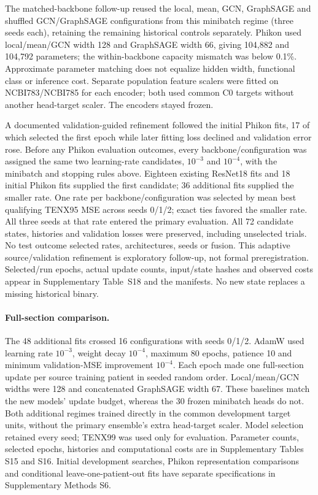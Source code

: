 The matched-backbone follow-up reused the local, mean, GCN, GraphSAGE and shuffled GCN/GraphSAGE configurations from this minibatch regime (three seeds each), retaining the remaining historical controls separately. Phikon used local/mean/GCN width 128 and GraphSAGE width 66, giving 104,882 and 104,792 parameters; the within-backbone capacity mismatch was below 0.1\%. Approximate parameter matching does not equalize hidden width, functional class or inference cost. Separate population feature scalers were fitted on NCBI783/NCBI785 for each encoder; both used common C0 targets without another head-target scaler. The encoders stayed frozen.

A documented validation-guided refinement followed the initial Phikon fits, 17 of which selected the first epoch while later fitting loss declined and validation error rose. Before any Phikon evaluation outcomes, every backbone/configuration was assigned the same two learning-rate candidates, $10^{-3}$ and $10^{-4}$, with the minibatch and stopping rules above. Eighteen existing ResNet18 fits and 18 initial Phikon fits supplied the first candidate; 36 additional fits supplied the smaller rate. One rate per backbone/configuration was selected by mean best qualifying TENX95 MSE across seeds 0/1/2; exact ties favored the smaller rate. All three seeds at that rate entered the primary evaluation. All 72 candidate states, histories and validation losses were preserved, including unselected trials. No test outcome selected rates, architectures, seeds or fusion. This adaptive source/validation refinement is exploratory follow-up, not formal preregistration. Selected/run epochs, actual update counts, input/state hashes and observed costs appear in Supplementary Table~S18 and the manifests. No new state replaces a missing historical binary.

\paragraph{Full-section comparison.}
The 48 additional fits crossed 16 configurations with seeds 0/1/2. AdamW used learning rate $10^{-3}$, weight decay $10^{-4}$, maximum 80 epochs, patience 10 and minimum validation-MSE improvement $10^{-4}$. Each epoch made one full-section update per source training patient in seeded random order. Local/mean/GCN widths were 128 and concatenated GraphSAGE width 67. These baselines match the new models' update budget, whereas the 30 frozen minibatch heads do not. Both additional regimes trained directly in the common development target units, without the primary ensemble's extra head-target scaler. Model selection retained every seed; TENX99 was used only for evaluation. Parameter counts, selected epochs, histories and computational costs are in Supplementary Tables S15 and S16. Initial development searches, Phikon representation comparisons~\cite{filiot2023} and conditional leave-one-patient-out fits have separate specifications in Supplementary Methods S6.

